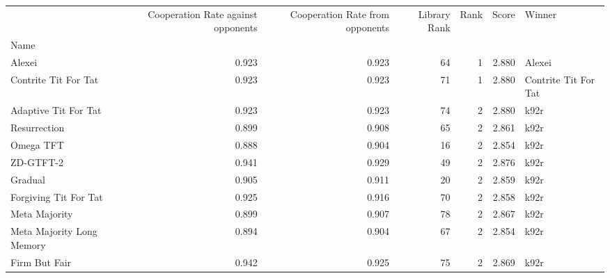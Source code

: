 \begin{tabular}{lrrrrrl}
\toprule
{} &  Cooperation Rate against opponents &  Cooperation Rate from opponents &  Library Rank &  Rank &  Score &                Winner \\
Name                       &                                     &                                  &               &       &        &                       \\
\midrule
Alexei                     &                               0.923 &                            0.923 &            64 &     1 &  2.880 &                Alexei \\
Contrite Tit For Tat       &                               0.923 &                            0.923 &            71 &     1 &  2.880 &  Contrite Tit For Tat \\
Adaptive Tit For Tat       &                               0.923 &                            0.923 &            74 &     2 &  2.880 &                  k92r \\
Resurrection               &                               0.899 &                            0.908 &            65 &     2 &  2.861 &                  k92r \\
Omega TFT                  &                               0.888 &                            0.904 &            16 &     2 &  2.854 &                  k92r \\
ZD-GTFT-2                  &                               0.941 &                            0.929 &            49 &     2 &  2.876 &                  k92r \\
Gradual                    &                               0.905 &                            0.911 &            20 &     2 &  2.859 &                  k92r \\
Forgiving Tit For Tat      &                               0.925 &                            0.916 &            70 &     2 &  2.858 &                  k92r \\
Meta Majority              &                               0.899 &                            0.907 &            78 &     2 &  2.867 &                  k92r \\
Meta Majority Long Memory  &                               0.894 &                            0.904 &            67 &     2 &  2.854 &                  k92r \\
Firm But Fair              &                               0.942 &                            0.925 &            75 &     2 &  2.869 &                  k92r \\

\end{tabular}
